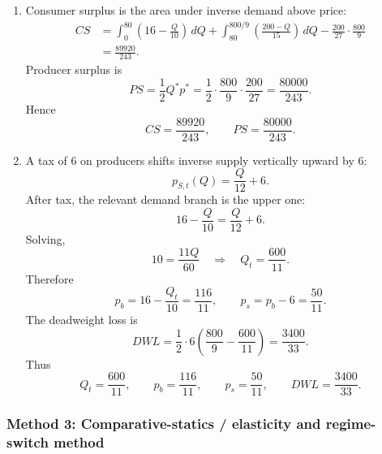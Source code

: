 \documentclass[12pt]{article}
\begin{document}
\begin{enumerate}[label=(\alph*)]
    \item
    Consumer surplus is the area under inverse demand above price:
    \begin{align*}
    CS
    &=\int_0^{80}\left(16-\frac{Q}{10}\right)\,dQ
      +\int_{80}^{800/9}\left(\frac{200-Q}{15}\right)\,dQ
      -\frac{200}{27}\cdot \frac{800}{9}\\
    &=\frac{89920}{243}.
    \end{align*}
    Producer surplus is
    \[
    PS=\frac12 Q^*p^*
    =\frac12\cdot \frac{800}{9}\cdot \frac{200}{27}
    =\frac{80000}{243}.
    \]
    Hence
    \[
    \boxed{CS=\frac{89920}{243},\qquad PS=\frac{80000}{243}.}
    \]

    \item
    A tax of 6 on producers shifts inverse supply vertically upward by 6:
    \[
    p_{S,t}(Q)=\frac{Q}{12}+6.
    \]
    After tax, the relevant demand branch is the upper one:
    \[
    16-\frac{Q}{10}=\frac{Q}{12}+6.
    \]
    Solving,
    \[
    10=\frac{11Q}{60}
    \quad\Longrightarrow\quad
    Q_t=\frac{600}{11}.
    \]
    Therefore
    \[
    p_b=16-\frac{Q_t}{10}=\frac{116}{11},
    \qquad
    p_s=p_b-6=\frac{50}{11}.
    \]
    The deadweight loss is
    \[
    DWL=\frac12\cdot 6\left(\frac{800}{9}-\frac{600}{11}\right)=\frac{3400}{33}.
    \]
    Thus
    \[
    \boxed{Q_t=\frac{600}{11},\qquad p_b=\frac{116}{11},\qquad p_s=\frac{50}{11},\qquad DWL=\frac{3400}{33}.}
    \]
\end{enumerate}

\newpage
\subsubsection{Method 3: Comparative-statics / elasticity and regime-switch method}
\end{document}

